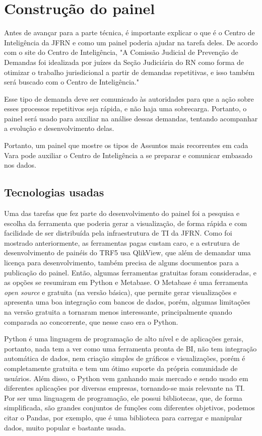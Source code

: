 \chapter{Construção do painel}\label{cap_trabalho_academico}

Antes de avançar para a parte técnica, é importante explicar o que é o Centro de Inteligência da JFRN e como um painel poderia ajudar na tarefa deles. De acordo com o site do Centro de Inteligência, "A Comissão Judicial de Prevenção de Demandas foi idealizada por juízes da Seção Judiciária do RN como forma de otimizar o trabalho jurisdicional a partir de demandas repetitivas, e isso também será buscado com o Centro de Inteligência."

Esse tipo de demanda deve ser comunicado às autoridades para que a ação sobre esses processos repetitivos seja rápida, e não haja uma sobrecarga. Portanto, o painel será usado para auxiliar na análise dessas demandas, tentando acompanhar a evolução e desenvolvimento delas. 

Portanto, um painel que mostre os tipos de Assuntos mais recorrentes em cada Vara pode auxiliar o Centro de Inteligência a se preparar e comunicar embasado nos dados.

\section{Tecnologias usadas}

Uma das tarefas que fez parte do desenvolvimento do painel foi a pesquisa e escolha da ferramenta que poderia gerar a visualização, de forma rápida e com facilidade de ser distribuída pela infraestrutura de TI da JFRN. Como foi mostrado anteriormente, as ferramentas pagas custam caro, e a estrutura de desenvolvimento de painéis do TRF5 usa QlikView, que além de demandar uma licença para desenvolvimento, também precisa de alguns documentos para a publicação do painel. Então, algumas ferramentas gratuitas foram consideradas, e as opções se resumiram em Python e Metabase. O Metabase é uma ferramenta \textit{open source} e gratuita (na versão básica), que permite gerar visualizações e apresenta uma boa integração com bancos de dados, porém, algumas limitações na versão gratuita a tornaram menos interessante, principalmente quando comparada ao concorrente, que nesse caso era o Python. 

Python é uma linguagem de programação de alto nível e de aplicações gerais, portanto, nada tem a ver como uma ferramenta pronta de BI, não tem integração automática de dados, nem criação simples de gráficos e visualizações, porém é completamente gratuita e tem um ótimo suporte da própria comunidade de usuários. Além disso, o Python vem ganhando mais mercado e sendo usado em diferentes aplicações por diversas empresas, tornando-se mais relevante na TI. Por ser uma linguagem de programação, ele possui bibliotecas, que, de forma simplificada, são grandes conjuntos de funções com diferentes objetivos, podemos citar o Pandas, por exemplo, que é uma biblioteca para carregar e manipular dados, muito popular e bastante usada. 

